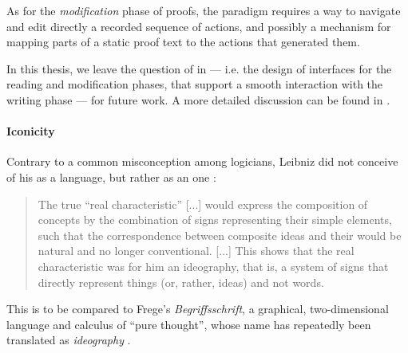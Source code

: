 As for the \emph{modification} phase of proofs, the  paradigm requires a way
to navigate and edit directly a recorded sequence of actions, and possibly a
mechanism for mapping parts of a static proof text to the actions that generated
them.

\begin{emphpar}
  In this thesis, we leave the question of  in  ---
  i.e. the design of interfaces for the reading and modification phases, that
  support a smooth interaction with the writing phase --- for future work. A
  more detailed discussion can be found in .
\end{emphpar}

\paragraph{Iconicity}


Contrary to a common misconception among logicians, Leibniz did not conceive of
his  as a  language, but rather as an
\emph{} one :
\begin{quote}
    The true ``real characteristic'' [...] would express the composition of
    concepts by the combination of signs representing their simple elements,
    such that the correspondence between composite ideas and their  would
    be natural and no longer conventional. [...] This shows that the real
    characteristic was for him an ideography, that is, a system of signs that
    directly represent things (or, rather, ideas) and not words.
\end{quote}
This is to be compared to Frege's \textit{Begriffsschrift}, a graphical,
two-dimensional language and calculus of ``pure thought'', whose name has
repeatedly been translated as \emph{ideography}
.

